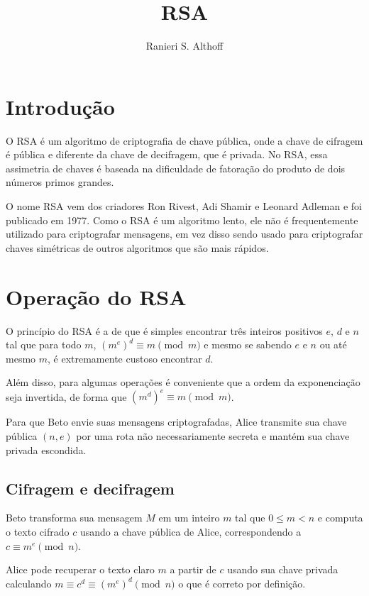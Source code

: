 \documentclass[12pt]{article}
\title{RSA}
\author{Ranieri S. Althoff\inst{1}}
\begin{document}
\maketitle

\section{Introdução}\label{sec:firstpage}

O RSA é um algoritmo de criptografia de chave pública, onde a chave de cifragem
é pública e diferente da chave de decifragem, que é privada. No RSA, essa
assimetria de chaves é baseada na dificuldade de fatoração do produto de dois
números primos grandes.

O nome RSA vem dos criadores Ron Rivest, Adi Shamir e Leonard Adleman e foi
publicado em 1977. Como o RSA é um algoritmo lento, ele não é frequentemente
utilizado para criptografar mensagens, em vez disso sendo usado para
criptografar chaves simétricas de outros algoritmos que são mais rápidos.

\section{Operação do RSA}

O princípio do RSA é a de que é simples encontrar três inteiros positivos $e$,
$d$ e $n$ tal que para todo $m$, $(m^{e})^{d} \equiv m \pmod{m}$ e mesmo se
sabendo $e$ e $n$ ou até mesmo $m$, é extremamente custoso encontrar $d$.

Além disso, para algumas operações é conveniente que a ordem da exponenciação
seja invertida, de forma que $(m^{d})^{e} \equiv m \pmod{m}$.

Para que Beto envie suas mensagens criptografadas, Alice transmite sua chave
pública $(n, e)$ por uma rota não necessariamente secreta e mantém sua chave
privada escondida.

\subsection{Cifragem e decifragem}

Beto transforma sua mensagem $M$ em um inteiro $m$ tal que $0 \leq m < n$ e
computa o texto cifrado $c$ usando a chave pública de Alice, correspondendo a
$c \equiv m^{e} \pmod{n}$.

Alice pode recuperar o texto claro $m$ a partir de $c$ usando sua chave privada
calculando $m \equiv c^{d} \equiv (m^{e})^{d} \pmod{n}$ o que é correto por
definição.
\end{document}
